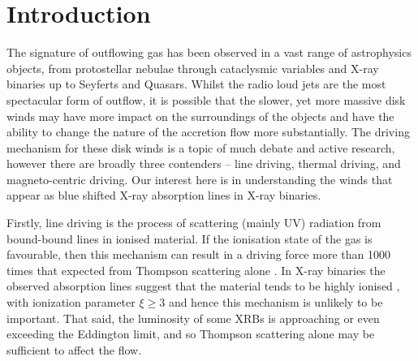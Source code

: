 \documentclass[a4paper,fleqn,usenatbib]{mnras}
\begin{document}
\section{Introduction}
The signature of outflowing gas has been observed in a vast range of astrophysics objects, from protostellar
nebulae through cataclysmic variables and X-ray binaries up to Seyferts and Quasars. Whilst the 
radio loud jets are the most spectacular form of outflow, it is possible that the slower, yet more massive disk
winds may have more impact on the surroundings of the objects and have the ability to change the nature
of the accretion flow more substantially.
The driving mechanism for these disk winds is a topic of much debate and active research, however there are broadly
three contenders -- line driving, thermal driving, and magneto-centric driving.  Our interest here is in understanding the winds that appear as blue shifted X-ray absorption lines in X-ray binaries.


Firstly, line driving is the process of scattering (mainly UV) radiation
from bound-bound lines in ionised material. If the ionisation state of the gas is 
favourable, then this mechanism can
result in a driving force more than  1000 times that expected from Thompson scattering alone \citep{1975ApJ...195..157C}.
 In X-ray binaries
the observed absorption lines suggest that the material tends to be highly ionised \citep[e.g.][]{2009ApJ...701..865K,
2018ApJ...861...26A}, with ionization parameter $\xi \geq 3$
\citep{2016AN....337..368D} and hence this mechanism is unlikely to be important. That said, the luminosity of 
some XRBs is 
approaching or even exceeding the Eddington limit, and so Thompson scattering alone may be sufficient to affect the
flow.
\end{document}
